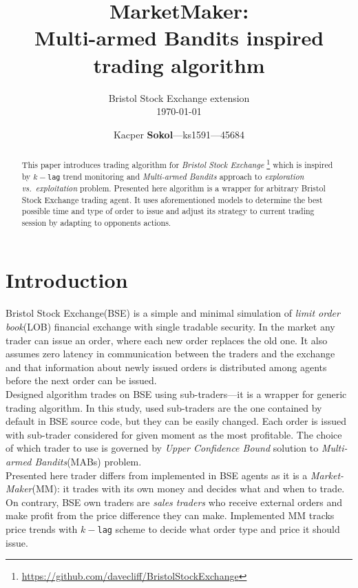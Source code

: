 \documentclass{llncs}
\begin{document}
\title{MarketMaker:\\Multi-armed Bandits inspired trading algorithm}
\subtitle{Bristol Stock Exchange extension\\[1em]\today}
\author{Kacper \textbf{Sokol}---ks1591---45684}
%
\maketitle
%

\begin{abstract}
This paper introduces trading algorithm for \emph{Bristol Stock Exchange}%
\footnote{\url{https://github.com/davecliff/BristolStockExchange}} %
which is inspired by $k-$\texttt{lag} trend monitoring and \emph{Multi-armed Bandits} approach to \emph{exploration vs.\ exploitation} problem. Presented here algorithm is a wrapper for arbitrary Bristol Stock Exchange trading agent. It uses aforementioned models to determine the best possible time and type of order to issue and adjust its strategy to current trading session by adapting to opponents actions.
\end{abstract}

\section{Introduction}
Bristol Stock Exchange(BSE) is a simple and minimal simulation of \emph{limit order book}(LOB) financial exchange with single tradable security. In the market any trader can issue an order, where each new order replaces the old one. It also assumes zero latency in communication between the traders and the exchange and that information about newly issued orders is distributed among agents before the next order can be issued.\\

Designed algorithm trades on BSE using sub-traders---it is a wrapper for generic trading algorithm. In this study, used sub-traders are the one contained by default in BSE source code, but they can be easily changed. Each order is issued with sub-trader considered for given moment as the most profitable. The choice of which trader to use is governed by \emph{Upper Confidence Bound} solution to \emph{Multi-armed Bandits}(MABs) problem.\\
Presented here trader differs from implemented in BSE agents as it is a \emph{Market-Maker}(MM): it trades with its own money and decides what and when to trade. On contrary, BSE own traders are \emph{sales traders} who receive external orders and make profit from the price difference they can make. Implemented MM tracks price trends with $k-$\texttt{lag} scheme to decide what order type and price it should issue.\\
\end{document}
